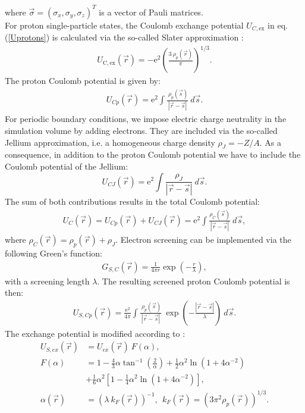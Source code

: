 \documentclass[4p]{elsarticle}
\begin{document}
where $\vec{\sigma} = (\sigma_x, \sigma_y, \sigma_z)^T$ is a vector of Pauli matrices. \\
For proton single-particle states, the Coulomb exchange potential $U_{C,\mathrm{ex}}$ in eq.(\ref{Uprotons}) is calculated via the so-called Slater approximation \cite{Chamel08}:
\begin{align}
U_\mathrm{C,ex} (\vec{r})= - \mathrm{e}^2 \left( \frac{3 \: \rho_p (\vec{r}) }{ \pi} \right)^{1/3}. 
\label{UCex}
\end{align}
The proton Coulomb potential is given by:
\begin{align}
U_{Cp} (\vec{r}) =  \mathrm{e}^2 \int \frac{ \: \rho_p (\vec{s})}{\left| \vec{r} - \vec{s} \right| } \: d \vec{s} . 
\label{UCp}
\end{align}
For periodic boundary conditions, we impose electric charge neutrality in the simulation volume by adding electrons. They are included via the so-called Jellium approximation, i.e. a homogeneous charge density $\rho_J = - Z/A$. As a consequence, in addition to the proton Coulomb potential we have to include the Coulomb potential of the Jellium:
\begin{equation}
U_{CJ} (\vec{r}) = \mathrm{e}^2 \int  \frac{\rho_J}{\left| \vec{r} - \vec{s} \right| } \: d \vec{s} .
\end{equation}
The sum of both contributions results in the total Coulomb potential: 
\begin{align}
U_C (\vec{r}) =  U_{Cp} (\vec{r}) + U_{CJ} (\vec{r}) =  \mathrm{e}^2 \int \frac{ \rho_C (\vec{s})}{\left| \vec{r} - \vec{s} \right| }  \: d\vec{s} , 
\end{align}  
where $\rho_C (\vec{r})= \rho_{p} (\vec{r})+ \rho_{J}$. Electron screening can be implemented via the following Green's function:
\begin{align}
G_{S,C} (\vec{r}) = \frac{1}{4 \pi r} \exp\left(-\frac{r}{\lambda}\right), 
\end{align}
with a screening length $\lambda$. The resulting screened proton Coulomb potential is then: 
\begin{align}
U_{S,Cp} (\vec{r}) = \frac{\mathrm{e}^2}{4 \pi}  \int \frac{ \: \rho_p (\vec{s})}{\left| \vec{r} - \vec{s} \right| } \: \exp\left(-\frac{\left| \vec{r} - \vec{s} \right|}{\lambda} \right)  \: d \vec{s}. 
\end{align}
The exchange potential is modified according to \cite{Mohammed84, Robinson62}:
\begin{align}
U_{S,ex} (\vec{r}) &= U_{ex} (\vec{r}) \: F(\alpha ), 
\label{Uscrex}\\
F(\alpha )& = 1 - \frac{4}{3} \alpha \tan^{-1} \left( \frac{2}{\alpha} \right) + \frac{1}{2} \alpha^2 \ln \left( 1 + 4 \alpha^{-2} \right) \\
&+ \frac{1}{6} \alpha^2 \left[ 1 - \frac{1}{4} \alpha^2 \ln ( 1 + 4 \alpha^{-2}) \right] , \\
 \alpha (\vec{r}) &= \left( \lambda \: k_F (\vec{r}) \right)^{-1}, \:\: k_F (\vec{r}) = \left(3 \pi^2 \rho_p (\vec{r}) \right)^{1/3} .
\label{Fgamma}
\end{align}
\end{document}
